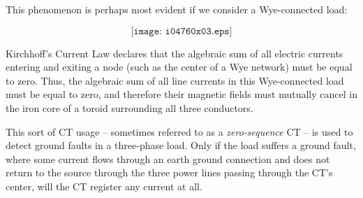 This phenomenon is perhaps most evident if we consider a Wye-connected load:

$$\texttt{[image: i04760x03.eps]}$$

Kirchhoff's Current Law declares that the algebraic sum of all electric currents entering and exiting a node (such as the center of a Wye network) must be equal to zero.  Thus, the algebraic sum of all line currents in this Wye-connected load must be equal to zero, and therefore their magnetic fields must mutually cancel in the iron core of a toroid surrounding all three conductors.

\vskip 10pt

This sort of CT usage -- sometimes referred to as a {\it zero-sequence} CT -- is used to detect ground faults in a three-phase load.  Only if the load suffers a ground fault, where some current flows through an earth ground connection and does not return to the source through the three power lines passing through the CT's center, will the CT register any current at all.





